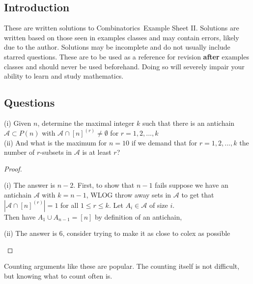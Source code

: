 \documentclass[a4paper]{article}
\def\ntitle{Combinatorics}
\def\nsheet{II}
\begin{document}
	
	
	\subsection*{Introduction}
	These are written solutions to \ntitle \ Example Sheet \nsheet. Solutions are written based on those seen in examples classes and may contain errors, likely due to the author. Solutions may be incomplete and do not usually include starred questions. These are to be used as a reference for revision \textbf{after} examples classes and should never be used beforehand. Doing so will severely impair your ability to learn and study mathematics.
	\subsection*{Questions}

	\begin{question}[Question 1]
	(i) Given $n$, determine the maximal integer $k$ such that there is an antichain $\mathcal{A} \subset P(n)$ with $\mathcal{A} \cap [n]^{(r)} \not = \emptyset$ for $r = 1,2,...,k$\\
	(ii) And what is the maximum for $n = 10$ if we demand that for $r = 1,2,...,k$ the number of $r$-subsets in $\mathcal{A}$ is at least $r$?		
	\end{question}
	
	\begin{proof}
	\begin{description}
	\item (i) The answer is $n-2$. First, to show that $n-1$ fails suppose we have an antichain $\mathcal{A}$ with $k = n-1$, WLOG throw away sets in $\mathcal{A}$ to get that $|\mathcal{A} \cap [n]^{(r)}| = 1$ for all $1 \leq r \leq k$. Let $A_i \in \mathcal{A}$ of size $i$.\\
	Then have $A_1 \cup A_{n-1} = [n]$ by definition of an antichain, 
	
	\item (ii) The answer is $6$, consider trying to make it as close to colex as possible
	\end{description}		
	\end{proof}
	\begin{remark}
	Counting arguments like these are popular. The counting itself is not difficult, but knowing what to count often is.
	\end{remark}
\end{document}
